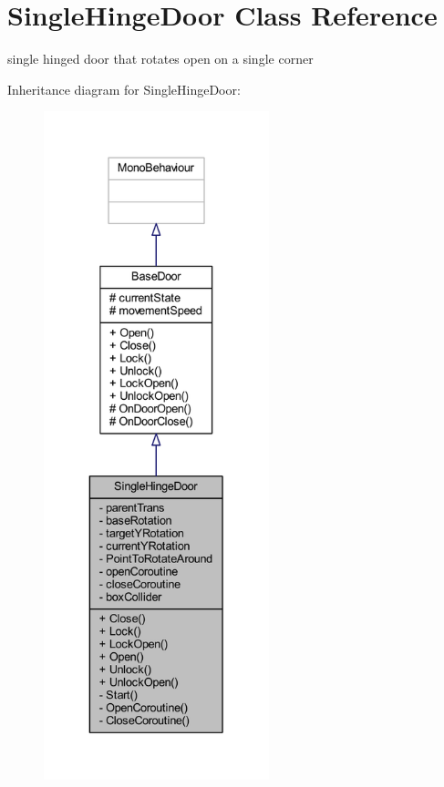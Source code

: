 \hypertarget{class_single_hinge_door}{}\section{Single\+Hinge\+Door Class Reference}
\label{class_single_hinge_door}


single hinged door that rotates open on a single corner  




Inheritance diagram for Single\+Hinge\+Door\+:
\nopagebreak
\begin{figure}[H]
\begin{center}
\leavevmode
\includegraphics[height=550pt]{class_single_hinge_door__inherit__graph}
\end{center}
\end{figure}


